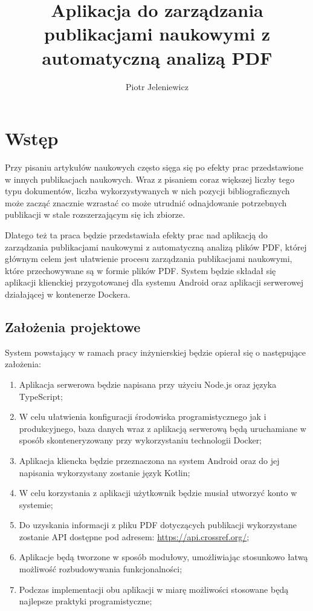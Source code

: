 \documentclass[a4paper,12pt,twoside,openany]{report}
\title{Aplikacja do zarządzania publikacjami naukowymi z automatyczną analizą PDF}
\author{Piotr Jeleniewicz}
\begin{document}
\maketitle

\chapter{Wstęp}
Przy pisaniu artykułów naukowych często sięga się po efekty prac przedstawione w innych publikacjach naukowych. Wraz z pisaniem coraz większej liczby tego typu dokumentów, liczba wykorzystywanych w nich pozycji bibliograficznych może zacząć znacznie wzrastać co może utrudnić odnajdowanie potrzebnych publikacji w stale rozszerzającym się ich zbiorze. 

Dlatego też ta praca będzie przedstawiała efekty prac nad aplikacją do zarządzania publikacjami naukowymi z automatyczną analizą plików PDF, której głównym celem jest ułatwienie procesu zarządzania publikacjami naukowymi, które przechowywane są w formie plików PDF. System będzie składał się aplikacji klienckiej przygotowanej dla systemu Android oraz aplikacji serwerowej działającej w kontenerze Dockera.
\section{Założenia projektowe}

\hspace{10pt} 	System powstający w ramach pracy inżynierskiej będzie opierał się o następujące założenia: 	
\begin{enumerate}
	\item Aplikacja serwerowa będzie napisana przy użyciu Node.js oraz języka TypeScript;
	\item W celu ułatwienia konfiguracji środowiska programistycznego jak i produkcyjnego, baza danych wraz z aplikacją serwerową będą uruchamiane w sposób skonteneryzowany przy wykorzystaniu technologii Docker;
	\item Aplikacja kliencka będzie przeznaczona na system Android oraz do jej napisania wykorzystany zostanie język Kotlin;
	\item W celu korzystania z aplikacji użytkownik będzie musiał utworzyć konto w systemie;
	\item Do uzyskania informacji z pliku PDF dotyczących publikacji wykorzystane zostanie API dostępne pod adresem: \newline \url{https://api.crossref.org/};
	\item Aplikacje będą tworzone w sposób modułowy, umożliwiając stosunkowo łatwą możliwość rozbudowywania funkcjonalności;
	\item Podczas implementacji obu aplikacji w miarę możliwości stosowane będą najlepsze praktyki programistyczne;
\end{enumerate}
\end{document}
